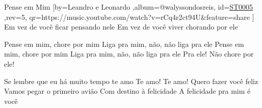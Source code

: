 \beginsong
{Pense em Mim %
}[by={Leandro e Leonardo %
},album={@walyssondosreis},
id={\href{https://music.youtube.com/watch?v=rCq4r2ct94U&feature=share %
}{ST0005 %
}},rev={5}, %
qr={https://music.youtube.com/watch?v=rCq4r2ct94U&feature=share %
}]
\beginverse
Em vez de você ficar pensando nele
Em vez de você viver chorando por ele
\endverse

\beginchorus
Pense em mim, chore por mim
Liga pra mim, não, não liga pra ele
Pense em mim, chore por mim
Liga pra mim, não, não liga pra ele
Pra ele! Não chore por ele!
\endchorus

\beginverse
Se lembre que eu há muito tempo te amo
Te amo! Te amo!
Quero fazer você feliz
Vamos pegar o primeiro avião
Com destino à felicidade
A felicidade pra mim é você
\endverse
{}


